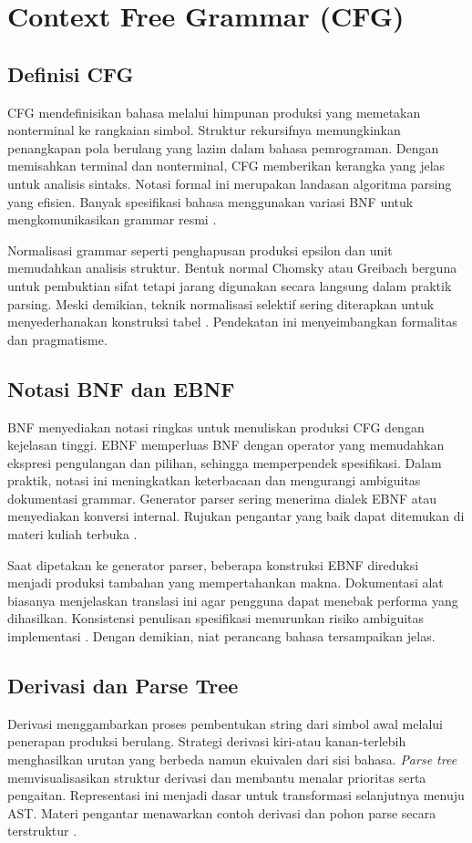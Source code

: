\documentclass[../main.tex]{subfiles}
\begin{document}
\section{Context Free Grammar (CFG)}
\subsection{Definisi CFG}
CFG mendefinisikan bahasa melalui himpunan produksi yang memetakan nonterminal ke rangkaian simbol. Struktur rekursifnya memungkinkan penangkapan pola berulang yang lazim dalam bahasa pemrograman. Dengan memisahkan terminal dan nonterminal, CFG memberikan kerangka yang jelas untuk analisis sintaks. Notasi formal ini merupakan landasan algoritma parsing yang efisien. Banyak spesifikasi bahasa menggunakan variasi BNF untuk mengkomunikasikan grammar resmi \citep{Mogensen2010}.

Normalisasi grammar seperti penghapusan produksi epsilon dan unit memudahkan analisis struktur. Bentuk normal Chomsky atau Greibach berguna untuk pembuktian sifat tetapi jarang digunakan secara langsung dalam praktik parsing. Meski demikian, teknik normalisasi selektif sering diterapkan untuk menyederhanakan konstruksi tabel \citep{Mogensen2010}. Pendekatan ini menyeimbangkan formalitas dan pragmatisme.

\subsection{Notasi BNF dan EBNF}
BNF menyediakan notasi ringkas untuk menuliskan produksi CFG dengan kejelasan tinggi. EBNF memperluas BNF dengan operator yang memudahkan ekspresi pengulangan dan pilihan, sehingga memperpendek spesifikasi. Dalam praktik, notasi ini meningkatkan keterbacaan dan mengurangi ambiguitas dokumentasi grammar. Generator parser sering menerima dialek EBNF atau menyediakan konversi internal. Rujukan pengantar yang baik dapat ditemukan di materi kuliah terbuka \citep{CS143}.

Saat dipetakan ke generator parser, beberapa konstruksi EBNF direduksi menjadi produksi tambahan yang mempertahankan makna. Dokumentasi alat biasanya menjelaskan translasi ini agar pengguna dapat menebak performa yang dihasilkan. Konsistensi penulisan spesifikasi menurunkan risiko ambiguitas implementasi \citep{CS143}. Dengan demikian, niat perancang bahasa tersampaikan jelas.

\subsection{Derivasi dan Parse Tree}
Derivasi menggambarkan proses pembentukan string dari simbol awal melalui penerapan produksi berulang. Strategi derivasi kiri-atau kanan-terlebih menghasilkan urutan yang berbeda namun ekuivalen dari sisi bahasa. \emph{Parse tree} memvisualisasikan struktur derivasi dan membantu menalar prioritas serta pengaitan. Representasi ini menjadi dasar untuk transformasi selanjutnya menuju AST. Materi pengantar menawarkan contoh derivasi dan pohon parse secara terstruktur \citep{CS143}.
\end{document}
